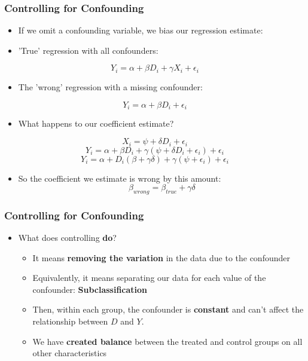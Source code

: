 \documentclass[xcolor=x11names,compress]{beamer}\usepackage[]{graphicx}\usepackage[]{color}
\renewcommand{\(}{\begin{columns}}
\renewcommand{\)}{\end{columns}}
\newcommand{\<}[1]{\begin{column}{#1}}
\renewcommand{\>}{\end{column}}
\begin{document}
\begin{frame}
\frametitle{Controlling for Confounding}
\begin{itemize}
\footnotesize
\item If we omit a confounding variable, we bias our regression estimate:
\pause
\item 'True' regression with all confounders: 
\end{itemize}
$$ Y_i = \alpha + \beta D_i + \gamma X_i + \epsilon_i$$
\begin{itemize}
\pause
\footnotesize
\item The 'wrong' regression with a missing confounder:
\pause
\end{itemize}
$$ Y_i = \alpha + \beta D_i + \epsilon_i$$
\pause
\begin{itemize}
\footnotesize
\item What happens to our coefficient estimate?
\pause
\end{itemize}
$$ X_i = \psi + \delta D_i + \epsilon_i$$
\pause
$$ Y_i = \alpha + \beta D_i + \gamma (\psi + \delta D_i + \epsilon_i) + \epsilon_i $$
\pause
$$ Y_i = \alpha + D_i (\beta + \gamma \delta) + \gamma (\psi  + \epsilon_i) + \epsilon_i $$
\pause
\begin{itemize}
\footnotesize
\item So the coefficient we estimate is wrong by this amount:
\pause
$$ \beta_{wrong} = \beta_{true} + \gamma \delta$$
\end{itemize}
\normalsize
\end{frame}


\begin{frame}
\frametitle{Controlling for Confounding}
\begin{itemize}
\item What does controlling \textbf{do}?
\begin{itemize}
\pause 
\item It means \textbf{removing the variation} in the data due to the confounder
\pause
\item Equivalently, it means separating our data for each value of the confounder: \textbf{Subclassification}
\pause
\item Then, within each group, the confounder is \textbf{constant} and can't affect the relationship between $D$ and $Y$.
\pause
\item We have \textbf{created balance} between the treated and control groups on all other characteristics
\end{itemize}
\end{itemize}
\end{frame}
\end{document}
